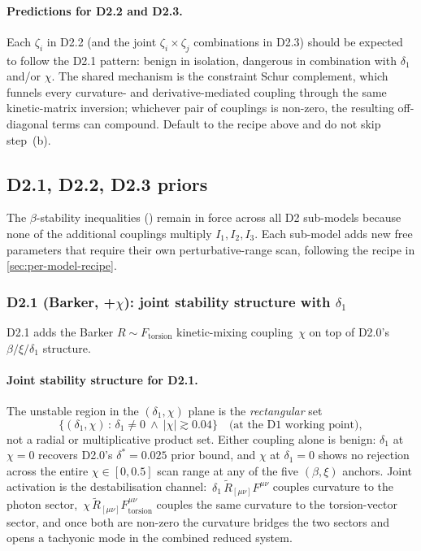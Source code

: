 \paragraph{Predictions for D2.2 and D2.3.}
Each $\zeta_i$ in D2.2 (and the joint $\zeta_i\!\times\!\zeta_j$
combinations in D2.3) should be expected to follow the D2.1
pattern: benign in isolation, dangerous in combination with
$\delta_1$ and/or $\chi$.  The shared mechanism is the constraint
Schur complement, which funnels every curvature- and
derivative-mediated coupling through the same kinetic-matrix
inversion; whichever pair of couplings is non-zero, the resulting
off-diagonal terms can compound.  Default to the recipe above and
do not skip step~(b).

\subsection{D2.1, D2.2, D2.3 priors}
\label{sec:d2x-priors}

The $\beta$-stability inequalities ()
remain in force across all D2 sub-models because none of the additional
couplings multiply $I_1, I_2, I_3$.  Each sub-model adds new free parameters
that require their own perturbative-range scan, following the recipe in
\cref{sec:per-model-recipe}.

\subsubsection*{D2.1 (Barker, +$\chi$): joint stability structure with $\delta_1$}
\label{sec:d21-priors}

D2.1 adds the Barker $R\!\sim\!\!F_{\text{torsion}}$ kinetic-mixing
coupling~$\chi$ on top of D2.0's $\beta/\xi/\delta_1$ structure.

\paragraph{Joint stability structure for D2.1.}
The unstable region in the $(\delta_1,\chi)$ plane is the
\emph{rectangular} set
\begin{equation*}
  \{(\delta_1,\chi)\,:\, \delta_1 \neq 0\ \wedge\ |\chi| \gtrsim 0.04\}
  \quad\text{(at the D1 working point)},
\end{equation*}
not a radial or multiplicative product set.  Either coupling alone
is benign: $\delta_1$ at $\chi=0$ recovers D2.0's $\delta^*=0.025$
prior bound, and $\chi$ at $\delta_1=0$ shows no rejection across
the entire $\chi \in [0, 0.5]$ scan range at any of the five
$(\beta,\xi)$ anchors.  Joint activation is the destabilisation
channel:~$\delta_1\, \tilde{R}_{[\mu\nu]} F^{\mu\nu}$ couples
curvature to the photon sector,~$\chi\, \tilde{R}_{[\mu\nu]}
F_\mathrm{torsion}^{\mu\nu}$ couples the same curvature to the
torsion-vector sector, and once both are non-zero the curvature
bridges the two sectors and opens a tachyonic mode in the combined
reduced system.

